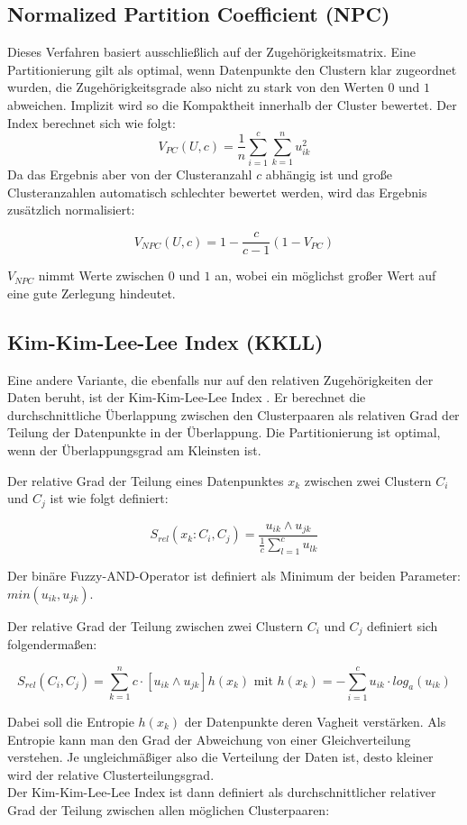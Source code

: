 \documentclass[11pt,ceqn]{book}
\begin{document}
\subsection{Normalized Partition Coefficient (NPC)}
Dieses Verfahren \cite{npc} basiert ausschließlich auf der Zugehörigkeitsmatrix. Eine Partitionierung gilt als optimal, wenn Datenpunkte den Clustern klar zugeordnet wurden, die Zugehörigkeitsgrade also nicht zu stark von den Werten $0$ und $1$ abweichen. Implizit wird so die Kompaktheit innerhalb der Cluster bewertet. Der Index berechnet sich wie folgt:
$$V_{PC}(U,c) = \frac{1}{n} \sum\limits_{i=1}^c \sum\limits_{k=1}^n u_{ik}^2$$
Da das Ergebnis aber von der Clusteranzahl $c$ abhängig ist und große Clusteranzahlen automatisch schlechter bewertet werden, wird das Ergebnis zusätzlich normalisiert:

$$V_{NPC}(U,c) = 1- \frac{c}{c-1}\left(1-V_{PC}\right)$$

$V_{NPC}$ nimmt Werte zwischen $0$ und $1$ an, wobei ein möglichst großer Wert auf eine gute Zerlegung hindeutet.

\subsection{Kim-Kim-Lee-Lee Index (KKLL)}
Eine andere Variante, die ebenfalls nur auf den relativen Zugehörigkeiten der Daten beruht, ist der Kim-Kim-Lee-Lee Index \cite{kkll}. Er berechnet die durchschnittliche Überlappung zwischen den Clusterpaaren als relativen Grad der Teilung der Datenpunkte in der Überlappung. Die Partitionierung ist optimal, wenn der Überlappungsgrad am Kleinsten ist.

Der relative Grad der Teilung eines Datenpunktes $x_k$ zwischen zwei
Clustern $C_i$ und $C_j$ ist wie folgt definiert:

$$S_{rel}(x_k\colon C_i,C_j) = \frac{u_{ik} \land u_{jk}}{\frac{1}{c} \sum\limits_{l=1}^c u_{lk}}$$

Der binäre Fuzzy-AND-Operator ist definiert als Minimum der beiden Parameter: $min(u_{ik}, u_{jk})$.

Der relative Grad der Teilung zwischen zwei Clustern $C_i$ und $C_j$ definiert sich folgendermaßen:

$$S_{rel}(C_i,C_j) = \sum_{k=1}^n c\cdot \left[u_{ik} \land u_{jk}\right] h(x_k) \text{ mit } h(x_k) = -\sum_{i=1}^c u_{ik}\cdot log_a(u_{ik})$$

Dabei soll die Entropie $h(x_k)$ der Datenpunkte deren Vagheit verstärken. Als Entropie kann man den Grad der Abweichung von einer Gleichverteilung verstehen. Je ungleichmäßiger also die Verteilung der Daten ist, desto kleiner wird der relative Clusterteilungsgrad.
\\
Der Kim-Kim-Lee-Lee Index ist dann definiert als durchschnittlicher
relativer Grad der Teilung zwischen allen möglichen Clusterpaaren:
\end{document}
